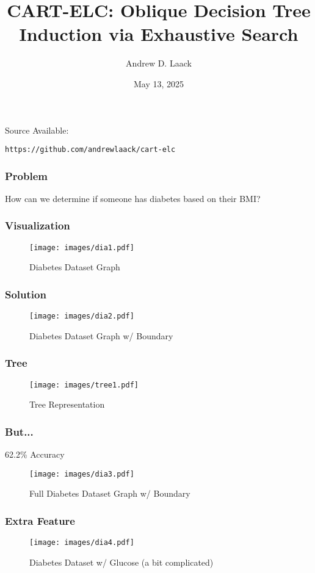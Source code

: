 \documentclass[10pt]{beamer}
\title{CART-ELC: Oblique Decision Tree \\ Induction via Exhaustive Search}
\author{Andrew D. Laack}
\institute{University of Wisconsin-Superior}
\date{May 13, 2025}
\begin{document}
\section{}


\begin{frame}
\titlepage

\footnotesize
Source Available:

\texttt{https://github.com/andrewlaack/cart-elc}

\end{frame}

\begin{frame}
	\frametitle{Problem}
	How can we determine if someone has diabetes based on their BMI?
\end{frame}

\begin{frame}
	\frametitle{Visualization}
	\begin{figure}[h]
		\centering
		\texttt{[image: images/dia1.pdf]}
		\caption{Diabetes Dataset \citep{diabetes} Graph}
	\end{figure}
\end{frame}

\begin{frame}
	\frametitle{Solution}
	\begin{figure}[h]
		\centering
		\texttt{[image: images/dia2.pdf]}
		\caption{Diabetes Dataset Graph w/ Boundary}
	\end{figure}
\end{frame}

\begin{frame}
	\frametitle{Tree}
	\begin{figure}[h]
		\centering
		\texttt{[image: images/tree1.pdf]}
		\caption{Tree Representation}
	\end{figure}
\end{frame}


\begin{frame}
	\frametitle{But...}
	62.2\% Accuracy
	\begin{figure}[h]
		\centering
		\texttt{[image: images/dia3.pdf]}
		\caption{Full Diabetes Dataset Graph w/ Boundary}
	\end{figure}
\end{frame}





\begin{frame}
	\frametitle{Extra Feature}
	\begin{figure}[h]
		\centering
		\texttt{[image: images/dia4.pdf]}
		\caption{Diabetes Dataset w/ Glucose (a bit complicated)}
	\end{figure}
\end{frame}
\end{document}
